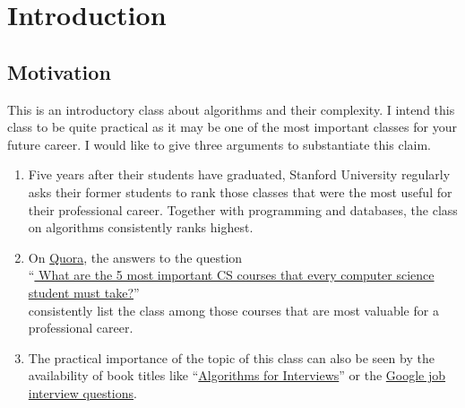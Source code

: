 \chapter{Introduction}
\section{Motivation}
This is an introductory class about algorithms and their complexity.
I intend this class to be quite practical as it may be one of the most important classes for your future
career.  I would like to give three arguments to substantiate this claim.
\begin{enumerate}
\item Five years after their students have graduated, Stanford University 
      regularly asks their former students to rank those classes that were the most useful for their professional
      career.  Together with programming and databases, the class on algorithms consistently ranks highest.
\item On \href{https://quora.com}{Quora}, the answers to the question
      \\[0.1cm]
      \hspace*{0.0cm}
      ``\href{https://www.quora.com/What-are-the-5-most-important-CS-courses-that-every-computer-science-student-must-take}{
        What are the 5 most important CS courses that every computer science student must take?}''
      \\[0.1cm]
      consistently list the class  among those courses that are most valuable
      for a professional career.  
\item The practical importance of the topic of this class can also be seen by the
      availability of book titles like
      ``\href{https://www.amazon.com/Algorithms-Interviews-Adnan-Aziz/dp/1453792996}{Algorithms for Interviews}''  
      \cite{aziz:10} or the \href{http://www.youtube.com/watch?v=k4RRi_ntQc8}{Google job interview questions}.
\end{enumerate} 
 
